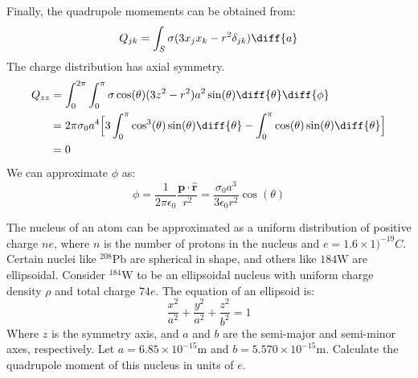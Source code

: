 \documentclass[crop=false,class=book,oneside]{standalone}
\begin{document}
\begin{solution}
\begin{equation}
                \end{equation}
                Finally, the quadrupole momements can be obtained from:
                \begin{equation}
                    Q_{jk}=\int_{S}\sigma
                        (3x_{j}x_{k}-r^{2}\delta_{jk})\diff{a}
                \end{equation}
                The charge distribution has axial symmetry.
                \begin{subequations}
                    \begin{align}
                        Q_{zz}&=
                        \int_{0}^{2\pi}\int_{0}^{\pi}\sigma\cos(\theta)
                            (3z^{2}-r^{2})a^{2}\sin(\theta)
                            \diff{\theta}\diff{\phi}\\
                        &=2\pi\sigma_{0}a^{4}
                            \Big[3\int_{0}^{\pi}\cos^{3}(\theta)
                                 \sin(\theta)\diff{\theta}-
                                 \int_{0}^{\pi}\cos(\theta)\sin(\theta)
                                 \diff{\theta}\Big]\\
                        &=0
                    \end{align}
                \end{subequations}
                We can approximate $\phi$ as:
                \begin{equation}
                    \phi=\frac{1}{2\pi\epsilon_{0}}
                        \frac{\mathbf{p}\cdot\hat{\mathbf{r}}}{r^{2}}
                        =\frac{\sigma_{0}a^{3}}{3\epsilon_{0}r^{2}}
                            \cos(\theta)
                \end{equation}
            \end{solution}
            \begin{problem}
                The nucleus of an atom can be approximated as a
                uniform distribution of positive charge $ne$, where $n$
                is the number of protons in the nucleus and
                $e=1.6\times{1)}^{-19}C$. Certain nuclei like
                $^{208}\textrm{Pb}$ are spherical in shape, and
                others like ${184}\textrm{W}$ are ellipsoidal.
                Consider $^{184}\textrm{W}$ to be an ellipsoidal
                nucleus with uniform charge density $\rho$ and total charge
                $74e$. The equation of an ellipsoid is:
                \begin{equation}
                    \frac{x^{2}}{a^{2}}+\frac{y^{2}}{a^{2}}
                                       +\frac{z^{2}}{b^{2}}=1
                \end{equation}
                Where $z$ is the symmetry axis, and $a$ and $b$ are the
                semi-major and semi-minor axes, respectively.
                Let $a=6.85\times{10}^{-15}\textrm{m}$ and
                $b=5.570\times{10}^{-15}\textrm{m}$. Calculate the
                quadrupole moment of this nucleus in units of $e$.
            \end{problem}
\end{document}
